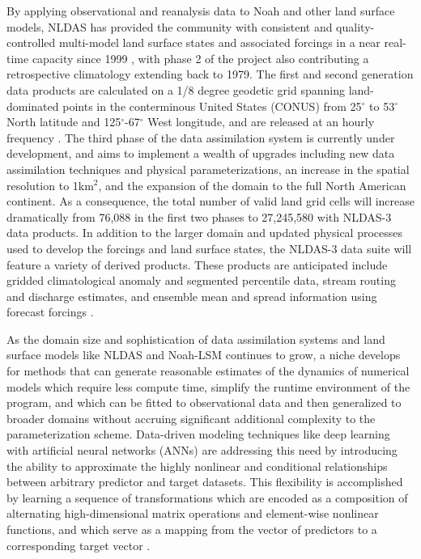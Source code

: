 By applying observational and reanalysis data to Noah and other land surface models, NLDAS has provided the community with consistent and quality-controlled multi-model land surface states and associated forcings in a near real-time capacity since 1999 \citep{cosgrove_real-time_2003}, with phase 2 of the project also contributing a retrospective climatology extending back to 1979. The first and second generation data products are calculated on a 1/8 degree geodetic grid spanning land-dominated points in the conterminous United States (CONUS) from 25$^\circ$ to 53$^\circ$ North latitude and 125$^\circ$-67$^\circ$ West longitude, and are released at an hourly frequency  \citep{mitchell_multi-institution_2004}\citep{xia_continental-scale_2012}. The third phase of the data assimilation system is currently under development, and aims to implement a wealth of upgrades including new data assimilation techniques and physical parameterizations, an increase in the spatial resolution to 1km$^2$, and the expansion of the domain to the full North American continent. As a consequence, the total number of valid land grid cells will increase dramatically from 76,088 in the first two phases to 27,245,580 with NLDAS-3 data products. In addition to the larger domain and updated physical processes used to develop the forcings and land surface states, the NLDAS-3 data suite will feature a variety of derived products. These products are anticipated include gridded climatological anomaly and segmented percentile data, stream routing and discharge estimates, and ensemble mean and spread information using forecast forcings \citep{kumar_north_2024}.

As the domain size and sophistication of data assimilation systems and land surface models like NLDAS and Noah-LSM continues to grow, a niche develops for methods that can generate reasonable estimates of the dynamics of numerical models which require less compute time, simplify the runtime environment of the program, and which can be fitted to observational data and then generalized to broader domains without accruing significant additional complexity to the parameterization scheme.  Data-driven modeling techniques like deep learning with artificial neural networks (ANNs) are addressing this need by introducing the ability to approximate the highly nonlinear and conditional relationships between arbitrary predictor and target datasets. This flexibility is accomplished by learning a sequence of transformations which are encoded as a composition of alternating high-dimensional matrix operations and element-wise nonlinear functions, and which serve as a mapping from the vector of predictors to a corresponding target vector \citep{hornik_multilayer_1989}.

